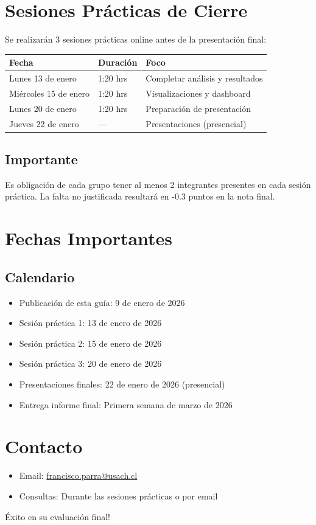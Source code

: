 \documentclass[11pt,a4paper]{article}
\begin{document}
\section{Sesiones Prácticas de Cierre}
Se realizarán 3 sesiones prácticas online antes de la presentación final:
\begin{center}
\begin{tabular}{p{} p{} p{}}
\toprule
\textbf{Fecha} & \textbf{Duración} & \textbf{Foco}\\
\midrule
Lunes 13 de enero & 1:20 hrs & Completar análisis y resultados\\
Miércoles 15 de enero & 1:20 hrs & Visualizaciones y dashboard\\
Lunes 20 de enero & 1:20 hrs & Preparación de presentación\\
Jueves 22 de enero & --- & Presentaciones (presencial)\\
\bottomrule
\end{tabular}
\end{center}

\subsection*{Importante}
Es obligación de cada grupo tener al menos 2 integrantes presentes en cada sesión práctica.
La falta no justificada resultará en -0.3 puntos en la nota final.

\section{Fechas Importantes}
\subsection*{Calendario}
\begin{itemize}[leftmargin=*]
\item Publicación de esta guía: 9 de enero de 2026
\item Sesión práctica 1: 13 de enero de 2026
\item Sesión práctica 2: 15 de enero de 2026
\item Sesión práctica 3: 20 de enero de 2026
\item Presentaciones finales: 22 de enero de 2026 (presencial)
\item Entrega informe final: Primera semana de marzo de 2026
\end{itemize}

\section{Contacto}
\begin{itemize}[leftmargin=*]
\item Email: \href{mailto:francisco.parra@usach.cl}{francisco.parra@usach.cl}
\item Consultas: Durante las sesiones prácticas o por email
\end{itemize}

\bigskip
\noindent Éxito en su evaluación final!
\end{document}
